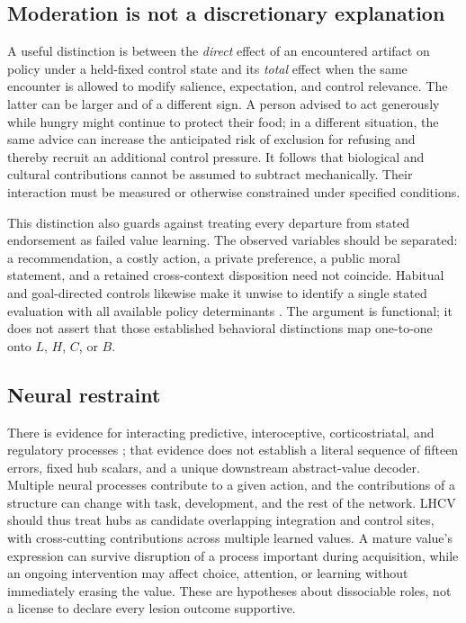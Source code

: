 \documentclass[11pt,a4paper]{article}
\begin{document}
\subsection{Moderation is not a discretionary explanation}
A useful distinction is between the \emph{direct} effect of an encountered artifact on policy under a held-fixed control state and its \emph{total} effect when the same encounter is allowed to modify salience, expectation, and control relevance. The latter can be larger and of a different sign. A person advised to act generously while hungry might continue to protect their food; in a different situation, the same advice can increase the anticipated risk of exclusion for refusing and thereby recruit an additional control pressure. It follows that biological and cultural contributions cannot be assumed to subtract mechanically. Their interaction must be measured or otherwise constrained under specified conditions.

This distinction also guards against treating every departure from stated endorsement as failed value learning. The observed variables should be separated: a recommendation, a costly action, a private preference, a public moral statement, and a retained cross-context disposition need not coincide. Habitual and goal-directed controls likewise make it unwise to identify a single stated evaluation with all available policy determinants \citep{balleine2010,dolan2013}. The argument is functional; it does not assert that those established behavioral distinctions map one-to-one onto $L$, $H$, $C$, or $B$.

\subsection{Neural restraint}
There is evidence for interacting predictive, interoceptive, corticostriatal, and regulatory processes \citep{barrett2015,balleine2010,keramati2014}; that evidence does not establish a literal sequence of fifteen errors, fixed hub scalars, and a unique downstream abstract-value decoder. Multiple neural processes contribute to a given action, and the contributions of a structure can change with task, development, and the rest of the network. LHCV should thus treat hubs as candidate overlapping integration and control sites, with cross-cutting contributions across multiple learned values. A mature value's expression can survive disruption of a process important during acquisition, while an ongoing intervention may affect choice, attention, or learning without immediately erasing the value. These are hypotheses about dissociable roles, not a license to declare every lesion outcome supportive.
\end{document}
